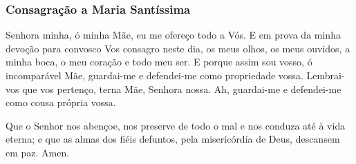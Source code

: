 \subsubsection{Consagração a Maria Santíssima}\label{consagracaodiamaria}

 Senhora minha, ó minha Mãe, eu me ofereço todo a Vós. E em prova da minha devoção para convosco Vos consagro neste dia, os meus olhos, os meus ouvidos, a minha boca, o meu coração e todo meu ser. E porque assim sou vosso, ó incomparável Mãe, guardai-me e defendei-me como propriedade vossa. Lembrai-vos que vos pertenço, terna Mãe, Senhora nossa. Ah, guardai-me e defendei-me como cousa própria vossa.\par
Que o Senhor nos abençoe, nos preserve de todo o mal e nos conduza até à vida eterna; e que as almas dos fiéis defuntos, pela misericórdia de Deus, descansem em paz. Amen. \cruz
